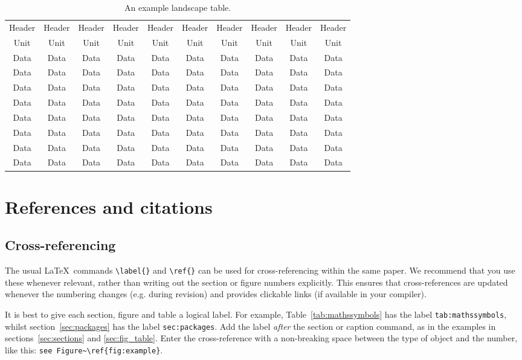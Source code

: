 \documentclass[fleqn,usenatbib,useAMS]{rasti}
\begin{document}
\begin{landscape}
 \begin{table}
  \caption{An example landscape table.}
  \label{tab:landscape}
  \begin{tabular}{cccccccccc}
    \hline
    Header & Header & Header & Header & Header & Header & Header & Header & Header & Header\\
    Unit & Unit & Unit & Unit & Unit & Unit & Unit & Unit & Unit & Unit \\
    \hline
    Data & Data & Data & Data & Data & Data & Data & Data & Data & Data\\
    Data & Data & Data & Data & Data & Data & Data & Data & Data & Data\\
    Data & Data & Data & Data & Data & Data & Data & Data & Data & Data\\
    Data & Data & Data & Data & Data & Data & Data & Data & Data & Data\\
    Data & Data & Data & Data & Data & Data & Data & Data & Data & Data\\
    Data & Data & Data & Data & Data & Data & Data & Data & Data & Data\\
    Data & Data & Data & Data & Data & Data & Data & Data & Data & Data\\
    Data & Data & Data & Data & Data & Data & Data & Data & Data & Data\\
    \hline
  \end{tabular}
 \end{table}
\end{landscape}

\section{References and citations}

\subsection{Cross-referencing}

The usual \LaTeX\ commands \verb'\label{}' and \verb'\ref{}' can be used for cross-referencing within the same paper.
We recommend that you use these whenever relevant, rather than writing out the section or figure numbers explicitly.
This ensures that cross-references are updated whenever the numbering changes (e.g. during revision) and provides clickable links (if available in your compiler).

It is best to give each section, figure and table a logical label.
For example, Table~\ref{tab:mathssymbols} has the label \verb'tab:mathssymbols', whilst section~\ref{sec:packages} has the label \verb'sec:packages'.
Add the label \emph{after} the section or caption command, as in the examples in sections~\ref{sec:sections} and \ref{sec:fig_table}.
Enter the cross-reference with a non-breaking space between the type of object and the number, like this: \verb'see Figure~\ref{fig:example}'.
\end{document}
